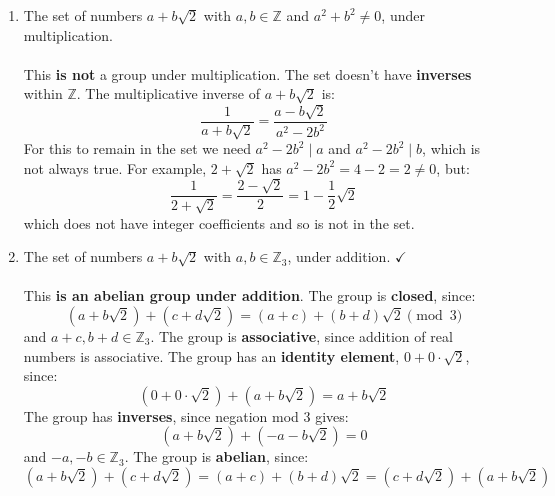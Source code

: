 \documentclass{article}
\newcommand{\Z}{\mathbb{Z}}
\newcommand{\Zn}[1]{\mathbb{Z}_{#1}}
\begin{document}
\begin{enumerate}
\begin{enumerate}
            \item The set of numbers $a + b\sqrt{2}$ with $a,b \in \Z$ and $a^2 + b^2 \neq 0$, under multiplication.
            \\
            \\ This \textbf{is not} a group under multiplication. The set doesn't have \textbf{inverses} within $\Z$. The multiplicative inverse of $a+b\sqrt{2}$ is:
            \[
                \frac{1}{a+b\sqrt{2}} = \frac{a - b\sqrt{2}}{a^2 - 2b^2}
            \]
            For this to remain in the set we need $a^2-2b^2 \mid a$ and $a^2-2b^2 \mid b$, which is not always true. For example, $2+\sqrt{2}$ has $a^2-2b^2=4-2=2\neq 0$, but:
            \[
                \frac{1}{2+\sqrt{2}} = \frac{2-\sqrt{2}}{2} = 1 - \frac{1}{2}\sqrt{2}
            \]
            which does not have integer coefficients and so is not in the set.

            \item The set of numbers $a + b\sqrt{2}$ with $a,b \in \Zn{3}$, under addition. $\checkmark$
            \\
            \\ This \textbf{is an abelian group under addition}. The group is \textbf{closed}, since:
            \[
                (a + b\sqrt{2}) + (c + d\sqrt{2}) = (a+c) + (b+d)\sqrt{2} \pmod{3}
            \]
            and $a+c, b+d \in \Zn{3}$. The group is \textbf{associative}, since addition of real numbers is associative. The group has an \textbf{identity element}, $0+0\cdot\sqrt{2}$, since:
            \[
                (0 + 0\cdot\sqrt{2}) + (a + b\sqrt{2}) = a + b\sqrt{2}
            \]
            The group has \textbf{inverses}, since negation mod 3 gives:
            \[
                (a + b\sqrt{2}) + (-a - b\sqrt{2}) = 0
            \]
            and $-a,-b \in \Zn{3}$. The group is \textbf{abelian}, since:
            \[
                (a + b\sqrt{2}) + (c + d\sqrt{2}) = (a+c)+(b+d)\sqrt{2} = (c + d\sqrt{2}) + (a + b\sqrt{2})
            \]


\end{enumerate}
\end{enumerate}
\end{document}
